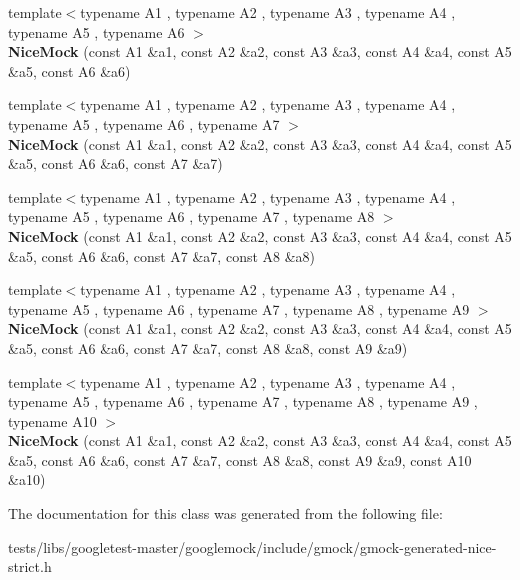 \begin{DoxyCompactItemize}
\item 
\mbox{\label{classtesting_1_1NiceMock_a156d0fce85ac08abffdf4aa0c3975f81}} 
{\footnotesize template$<$typename A1 , typename A2 , typename A3 , typename A4 , typename A5 , typename A6 $>$ }\\{\bfseries Nice\+Mock} (const A1 \&a1, const A2 \&a2, const A3 \&a3, const A4 \&a4, const A5 \&a5, const A6 \&a6)
\item 
\mbox{\label{classtesting_1_1NiceMock_a946d75ece1fa3a066b7d9d6ab7828c55}} 
{\footnotesize template$<$typename A1 , typename A2 , typename A3 , typename A4 , typename A5 , typename A6 , typename A7 $>$ }\\{\bfseries Nice\+Mock} (const A1 \&a1, const A2 \&a2, const A3 \&a3, const A4 \&a4, const A5 \&a5, const A6 \&a6, const A7 \&a7)
\item 
\mbox{\label{classtesting_1_1NiceMock_ae8792aab6c024a50886856bf1093eedc}} 
{\footnotesize template$<$typename A1 , typename A2 , typename A3 , typename A4 , typename A5 , typename A6 , typename A7 , typename A8 $>$ }\\{\bfseries Nice\+Mock} (const A1 \&a1, const A2 \&a2, const A3 \&a3, const A4 \&a4, const A5 \&a5, const A6 \&a6, const A7 \&a7, const A8 \&a8)
\item 
\mbox{\label{classtesting_1_1NiceMock_a61cfc9282222928590bcdaf851a806c6}} 
{\footnotesize template$<$typename A1 , typename A2 , typename A3 , typename A4 , typename A5 , typename A6 , typename A7 , typename A8 , typename A9 $>$ }\\{\bfseries Nice\+Mock} (const A1 \&a1, const A2 \&a2, const A3 \&a3, const A4 \&a4, const A5 \&a5, const A6 \&a6, const A7 \&a7, const A8 \&a8, const A9 \&a9)
\item 
\mbox{\label{classtesting_1_1NiceMock_a4baf1da52f4c892fc02f6ba10c0b8c02}} 
{\footnotesize template$<$typename A1 , typename A2 , typename A3 , typename A4 , typename A5 , typename A6 , typename A7 , typename A8 , typename A9 , typename A10 $>$ }\\{\bfseries Nice\+Mock} (const A1 \&a1, const A2 \&a2, const A3 \&a3, const A4 \&a4, const A5 \&a5, const A6 \&a6, const A7 \&a7, const A8 \&a8, const A9 \&a9, const A10 \&a10)
\end{DoxyCompactItemize}


The documentation for this class was generated from the following file\+:\begin{DoxyCompactItemize}
\item 
tests/libs/googletest-\/master/googlemock/include/gmock/gmock-\/generated-\/nice-\/strict.\+h\end{DoxyCompactItemize}
